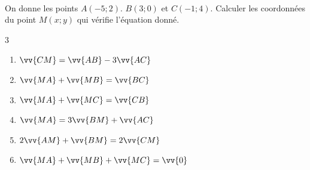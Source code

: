 \documentclass[main.tex]{subfiles}
\begin{document}
%
\begin{exercise} \hfill \\
On donne les points $A(-5;2)$. $B(3;0)$ et $C(-1;4)$. Calculer les coordonnées du point $M(x;y)$ qui vérifie l'équation donné.
\begin{multicols}{3} 
\begin{enumerate}[label=\alph*),leftmargin=*]
\item $\vv{CM}=\vv{AB}-3\vv{AC}$
\item  $\vv{MA}+\vv{MB}=\vv{BC}$ 
\item  $\vv{MA}+\vv{MC}=\vv{CB}$
\item $\vv{MA}=3\vv{BM}+\vv{AC}$
\item $2\vv{AM}+\vv{BM}=2\vv{CM}$ 
\item $\vv{MA}+\vv{MB}+\vv{MC}=\vv{0}$
\end{enumerate}
\end{multicols}
\end{exercise}







%	 

\newpage 
{}  
\pagestyle{scrheadings} %
\onehalfspacing
\end{document}
